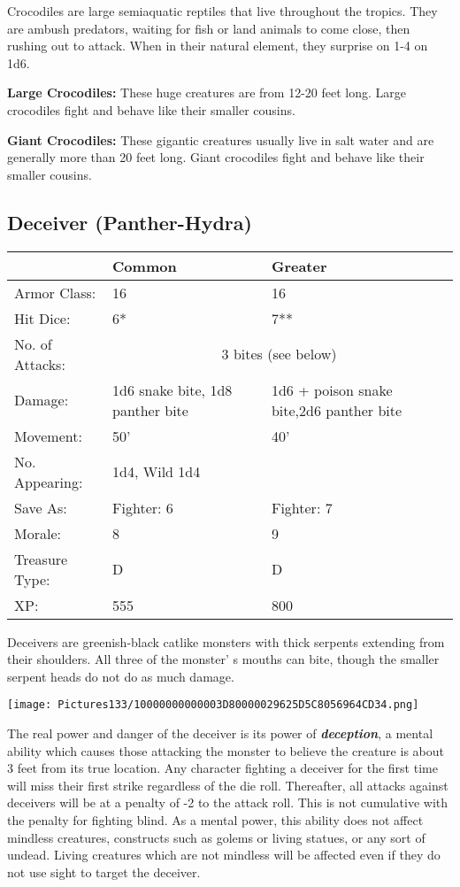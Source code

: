 \documentclass[a4paper,twoside,openany,10pt]{book}
\begin{document}
\begin{multicols}{2}
Crocodiles are large semiaquatic reptiles that live throughout the tropics. They are ambush predators, waiting for fish or land animals to come close, then rushing out to attack. When in their natural element, they surprise on 1-4 on 1d6.

\textbf{Large Crocodiles:} These huge creatures are from 12-20 feet long. Large crocodiles fight and behave like their smaller cousins.

\textbf{Giant Crocodiles:} These gigantic creatures usually live in salt water and are generally more than 20 feet long. Giant crocodiles fight and behave like their smaller cousins.

\subsection*{Deceiver (Panther-Hydra)}\label{deceiver-panther-hydra}

\begin{tabularx}{0.48\textwidth}{lXX}
& Common & Greater \\\hline
Armor Class: & 16 & 16 \\\hline
Hit Dice: & 6* & 7** \\\hline
No. of Attacks: &\multicolumn{2}{c}{3 bites (see below)} \\\hline
Damage: & 1d6 snake bite, 1d8 panther bite & 1d6 + poison snake bite,2d6 panther bite \\\hline
Movement: & 50' & 40' \\\hline
No. Appearing: & 1d4, Wild 1d4 & \\\hline
Save As: & Fighter: 6 & Fighter: 7 \\\hline
Morale: & 8 & 9 \\\hline
Treasure Type: & D & D \\\hline
XP: & 555 & 800 \\\hline
\end{tabularx}\medskip

Deceivers are greenish-black catlike monsters with thick serpents extending from their shoulders. All three of the monster' s mouths can bite, though the smaller serpent heads do not do as much damage.


\begin{center}
	\texttt{[image: Pictures133/10000000000003D80000029625D5C8056964CD34.png]}
\end{center}

The real power and danger of the deceiver is its power of \emph{\textbf{deception}}, a mental ability which causes those attacking the monster to believe the creature is about 3 feet from its true location. Any character fighting a deceiver for the first time will miss their first strike regardless of the die roll. Thereafter, all attacks against deceivers will be at a penalty of -2 to the attack roll. This is not cumulative with the penalty for fighting blind. As a mental power, this ability does not affect mindless creatures, constructs such as golems or living statues, or any sort of undead. Living creatures which are not mindless will be affected even if they do not use sight to target the deceiver.


\end{multicols}
\end{document}

